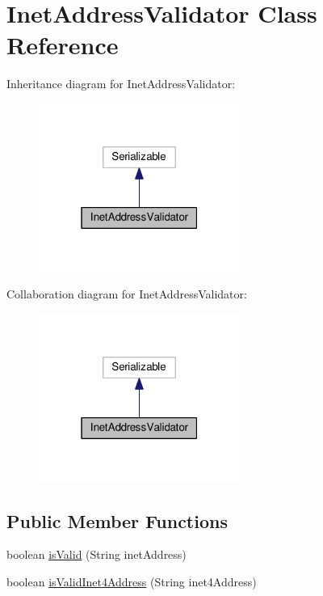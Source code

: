 \hypertarget{classInetAddressValidator}{}\section{Inet\+Address\+Validator Class Reference}
\label{classInetAddressValidator}


Inheritance diagram for Inet\+Address\+Validator\+:\nopagebreak
\begin{figure}[H]
\begin{center}
\leavevmode
\includegraphics[width=187pt]{classInetAddressValidator__inherit__graph}
\end{center}
\end{figure}


Collaboration diagram for Inet\+Address\+Validator\+:\nopagebreak
\begin{figure}[H]
\begin{center}
\leavevmode
\includegraphics[width=187pt]{classInetAddressValidator__coll__graph}
\end{center}
\end{figure}
\subsection*{Public Member Functions}
\begin{DoxyCompactItemize}
\item 
boolean \hyperlink{classInetAddressValidator_a266ab1d773ca178093917c9c2faae01a}{is\+Valid} (String inet\+Address)
\item 
boolean \hyperlink{classInetAddressValidator_a2bbbd69ca6baf133c01da93a5ad1b600}{is\+Valid\+Inet4\+Address} (String inet4\+Address)
\end{DoxyCompactItemize}
